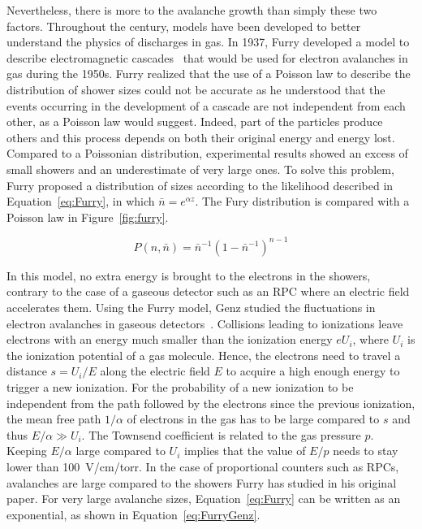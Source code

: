 \endgroup
	
	Nevertheless, there is more to the avalanche growth than simply these two factors. Throughout the  century, models have been developed to better understand the physics of discharges in gas. In 1937, Furry developed a model to describe electromagnetic cascades~\cite{FURRY1937} that would be used for electron avalanches in gas during the 1950s. Furry realized that the use of a Poisson law to describe the distribution of shower sizes could not be accurate as he understood that the events occurring in the development of a cascade are not independent from each other, as a Poisson law would suggest. Indeed, part of the particles produce others and this process depends on both their original energy and energy lost. Compared to a Poissonian distribution, experimental results showed an excess of small showers and an underestimate of very large ones. To solve this problem, Furry proposed a distribution of sizes according to the likelihood described in Equation~\ref{eq:Furry}, in which $\bar{n} = e^{\alpha z}$. The Fury distribution is compared with a Poisson law in Figure~\ref{fig:furry}.
	
	\begin{equation}
	\label{eq:Furry}
	P(n,\bar{n}) = \bar{n}^{-1} (1-\bar{n}^{-1})^{n-1}
	\end{equation}
	
	In this model, no extra energy is brought to the electrons in the showers, contrary to the case of a gaseous detector such as an RPC where an electric field accelerates them. Using the Furry model, Genz studied the fluctuations in electron avalanches in gaseous detectors~\cite{GENZ1973}. Collisions leading to ionizations leave electrons with an energy much smaller than the ionization energy $eU_i$, where $U_i$ is the ionization potential of a gas molecule. Hence, the electrons need to travel a distance $s = U_i/E$ along the electric field $E$ to acquire a high enough energy to trigger a new ionization. For the probability of a new ionization to be independent from the path followed by the electrons since the previous ionization, the mean free path $1/\alpha$ of electrons in the gas has to be large compared to $s$ and thus $E/\alpha \gg U_i$. The Townsend coefficient is related to the gas pressure $p$. Keeping $E/\alpha$ large compared to $U_i$ implies that the value of $E/p$ needs to stay lower than \SI{100}{V/cm/torr}. In the case of proportional counters such as RPCs, avalanches are large compared to the showers Furry has studied in his original paper. For very large avalanche sizes, Equation~\ref{eq:Furry} can be written as an exponential, as shown in Equation~\ref{eq:FurryGenz}.
	
